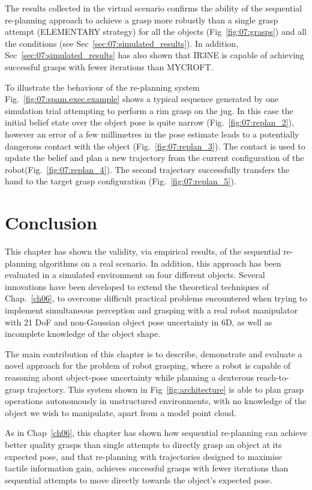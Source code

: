 The results collected in the virtual scenario confirms the ability of the sequential re-planning approach to achieve a grasp more robustly than a single grasp attempt (ELEMENTARY strategy) for all the objects (Fig~\ref{fig:07:grasps}) and all the conditions (see Sec~\ref{sec:07:simulated_results}). In addition, Sec~\ref{sec:07:simulated_results} has also shown that IR3NE is capable of achieving successful grasps with fewer iterations than MYCROFT.

To illustrate the behaviour of the re-planning system Fig.~\ref{fig:07:spam.exec.example} shows a typical sequence generated by one simulation trial attempting to perform a rim grasp on the jug. In this case the initial belief state over the object pose is quite narrow (Fig.~\ref{fig:07:replan_2}), however an error of a few millimetres in the pose estimate leads to a potentially dangerous contact with the object (Fig.~\ref{fig:07:replan_3}). The contact is used to update the belief and plan a new trajectory from the current configuration of the robot(Fig.~\ref{fig:07:replan_4}). The second trajectory successfully transfers the hand to the target grasp configuration (Fig.~\ref{fig:07:replan_5}).



\section{Conclusion}\label{sec:ch07:summary}

This chapter has shown the validity, via empirical results, of the sequential re-planning algorithms on a real scenario. In addition, this approach has been evaluated in a simulated environment on four different objects. Several innovations have been developed to extend the theoretical techniques of Chap.~\ref{ch06}, to overcome difficult practical problems encountered when trying to implement simultaneous perception and grasping with a real robot manipulator with 21 DoF and non-Gaussian object pose uncertainty in 6D, as well as incomplete knowledge of the object shape.

The main contribution of this chapter is to describe, demonstrate and evaluate a novel approach for the problem of robot grasping, where a robot is capable of reasoning about object-pose uncertainty while planning a dexterous reach-to-grasp trajectory. This system shown in Fig~\ref{fig:architecture} is able to plan grasp operations autonomously in unstructured environments, with no knowledge of the object we wish to manipulate, apart from a model point cloud. 

As in Chap~\ref{ch06},  this chapter has shown how sequential re-planning can achieve better quality grasps than single attempts to directly grasp an object at its expected pose, and that re-planning with trajectories designed to maximise tactile information gain, achieves successful grasps with fewer iterations than sequential attempts to move directly towards the object's expected pose.


